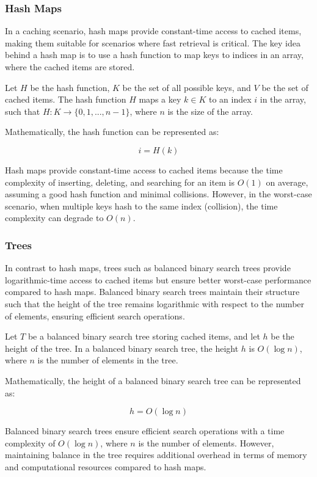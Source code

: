 \documentclass[12pt]{book} %
\begin{document}
\subsubsection{Hash Maps}

In a caching scenario, hash maps provide constant-time access to cached items, making them suitable for scenarios where fast retrieval is critical. The key idea behind a hash map is to use a hash function to map keys to indices in an array, where the cached items are stored. 

Let \(H\) be the hash function, \(K\) be the set of all possible keys, and \(V\) be the set of cached items. The hash function \(H\) maps a key \(k \in K\) to an index \(i\) in the array, such that \(H: K \rightarrow \{0, 1, ..., n-1\}\), where \(n\) is the size of the array.

Mathematically, the hash function can be represented as:

\[ i = H(k) \]

Hash maps provide constant-time access to cached items because the time complexity of inserting, deleting, and searching for an item is \(O(1)\) on average, assuming a good hash function and minimal collisions. However, in the worst-case scenario, when multiple keys hash to the same index (collision), the time complexity can degrade to \(O(n)\).

\subsubsection{Trees}

In contrast to hash maps, trees such as balanced binary search trees provide logarithmic-time access to cached items but ensure better worst-case performance compared to hash maps. Balanced binary search trees maintain their structure such that the height of the tree remains logarithmic with respect to the number of elements, ensuring efficient search operations.

Let \(T\) be a balanced binary search tree storing cached items, and let \(h\) be the height of the tree. In a balanced binary search tree, the height \(h\) is \(O(\log n)\), where \(n\) is the number of elements in the tree.

Mathematically, the height of a balanced binary search tree can be represented as:

\[ h = O(\log n) \]

Balanced binary search trees ensure efficient search operations with a time complexity of \(O(\log n)\), where \(n\) is the number of elements. However, maintaining balance in the tree requires additional overhead in terms of memory and computational resources compared to hash maps.
\end{document}
